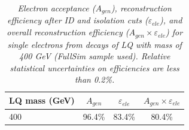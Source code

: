 %
\begin{table}[htb]
  \begin{center}
    \begin{tabular}{|l|c|c|c|} \hline
      LQ mass (GeV) & $A_{gen}$ & $\varepsilon_{ele}$ & $A_{gen} \times \varepsilon_{ele}$\\ \hline
      400 & 96.4\% & 83.4\% & 80.4\% \\ \hline
    \end{tabular}
    \caption{\small \sl Electron acceptance ($A_{gen}$), 
      reconstruction efficiency after ID and isolation cuts ($\varepsilon_{ele}$), and overall reconstruction efficiency 
      ($A_{gen} \times \varepsilon_{ele}$) for single electrons from decays of LQ with mass of 400 GeV (FullSim sample used).   
      Relative statistical uncertainties on efficiencies are less than 0.2\%.  
      } 
  \end{center}
  \label{tab:ElecEffAcc}
\end{table}
%
